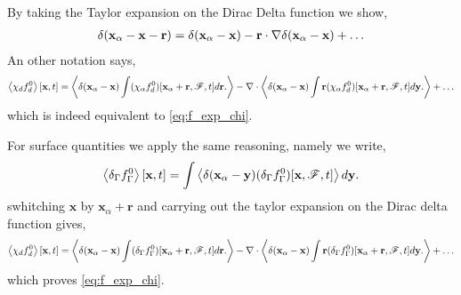 By taking the Taylor expansion on the Dirac Delta function we show, 
\begin{align}
    \delta(\textbf{x}_\alpha - \textbf{x} - \textbf{r})
    = 
    \delta(\textbf{x}_\alpha - \textbf{x})
    - \textbf{r} \cdot \mathbf{\nabla}\delta(\textbf{x}_\alpha - \textbf{x})
    + \ldots
\end{align}
An other notation says, 
\begin{align}
    \left<\chi_d f_d^0\right>[\textbf{x},t]
    =
    \left<
        \delta(\textbf{x}_\alpha - \textbf{x})
        \int 
        (\chi_\alpha
        f_d^0)[\textbf{x}_\alpha + \textbf{r},\mathscr{F},t]
        d\textbf{r}. 
    \right>
    -\mathbf{\nabla}\cdot
    \left< 
        \delta(\textbf{x}_\alpha - \textbf{x})
        \int 
        \textbf{r}
        (\chi_\alpha
        f_d^0)[\textbf{x}_\alpha+\textbf{r},\mathscr{F},t]
        d\textbf{y}. 
    \right>+\ldots
\end{align}
which is indeed equivalent to \ref{eq:f_exp_chi}. 

For surface quantities we apply the same reasoning, namely we write, 
\begin{align}
    \left<\delta_\Gamma f_\Gamma^0\right>[\textbf{x},t]
    =
    \int 
    \left<
        \delta(\textbf{x}_\alpha - \textbf{y})
        (\delta_\Gamma f_\Gamma^0)[\textbf{x},\mathscr{F},t]
    \right>
     d\textbf{y}. 
\end{align}
swhitching $\textbf{x}$ by $\textbf{x}_\alpha+\textbf{r}$ and carrying out the taylor expansion on the Dirac delta function gives, 
\begin{align}
    \left<\chi_d f_d^0\right>[\textbf{x},t]
    =
    \left<
        \delta(\textbf{x}_\alpha - \textbf{x})
        \int 
        (\delta_\Gamma f_\Gamma^0)[\textbf{x}_\alpha + \textbf{r},\mathscr{F},t]
        d\textbf{r}. 
    \right>
    -\mathbf{\nabla}\cdot
    \left< 
        \delta(\textbf{x}_\alpha - \textbf{x})
        \int 
        \textbf{r}
        (\delta_\Gamma f_\Gamma^0)[\textbf{x}_\alpha+\textbf{r},\mathscr{F},t]
        d\textbf{y}. 
    \right>+\ldots
\end{align}
which proves \ref{eq:f_exp_chi}. 
